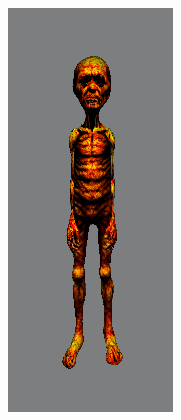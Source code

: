 \begin{figure}[ht]
\begin{subfigure}[b]{0.12\textwidth}
        \caption{}
    \end{subfigure}
    \begin{subfigure}[b]{0.118\textwidth}
        \centering
        \includegraphics[width=\textwidth]{figures/appendix/bias_poor_magic3d_part1.png}

\end{subfigure}
\end{figure}
